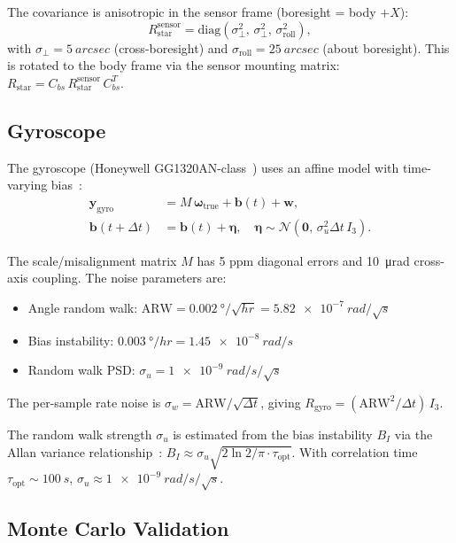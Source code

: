 \documentclass[conference]{IEEEtran}
\begin{document}
The covariance is anisotropic in the sensor frame (boresight = body $+X$):
\begin{equation}
  R_{\text{star}}^{\text{sensor}} = \text{diag}(\sigma_\perp^2,\, \sigma_\perp^2,\, \sigma_{\text{roll}}^2),
\end{equation}
with $\sigma_\perp = \SI{5}{arcsec}$ (cross-boresight) and
$\sigma_{\text{roll}} = \SI{25}{arcsec}$ (about boresight).
This is rotated to the body frame via the sensor mounting matrix:
$R_{\text{star}} = C_{bs}\, R_{\text{star}}^{\text{sensor}}\, C_{bs}^T$.

\subsection{Gyroscope}

The gyroscope (Honeywell GG1320AN-class~\cite{gg1320}) uses an affine model
with time-varying bias~\cite{titterton}:
\begin{align}
  \bm{y}_{\text{gyro}} &= M\,\bm{\omega}_{\text{true}} + \bm{b}(t) + \bm{w}, \label{eq:gyro_meas}\\
  \bm{b}(t + \Delta t) &= \bm{b}(t) + \bm{\eta}, \quad \bm{\eta} \sim \mathcal{N}(\bm{0},\, \sigma_u^2 \Delta t\, I_3). \label{eq:gyro_bias}
\end{align}

The scale/misalignment matrix $M$ has 5 ppm diagonal errors and
\SI{10}{\micro rad} cross-axis coupling.  The noise parameters are:
\begin{itemize}
  \item Angle random walk: $\text{ARW} = \SI{0.002}{\degree/\sqrt{hr}} = \SI{5.82e-7}{rad/\sqrt{s}}$
  \item Bias instability: $\SI{0.003}{\degree/hr} = \SI{1.45e-8}{rad/s}$
  \item Random walk PSD: $\sigma_u = \SI{1e-9}{rad/s/\sqrt{s}}$
\end{itemize}

The per-sample rate noise is $\sigma_w = \text{ARW}/\sqrt{\Delta t}$,
giving $R_{\text{gyro}} = (\text{ARW}^2/\Delta t)\,I_3$.

The random walk strength $\sigma_u$ is estimated from the bias instability
$B_I$ via the Allan variance relationship~\cite{titterton}:
$B_I \approx \sigma_u \sqrt{2\ln 2 / \pi \cdot \tau_{\text{opt}}}$.
With correlation time $\tau_{\text{opt}} \sim \SI{100}{s}$,
$\sigma_u \approx \SI{1e-9}{rad/s/\sqrt{s}}$.

\subsection{Monte Carlo Validation}
\end{document}
